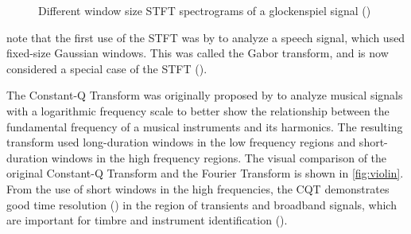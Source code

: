 \documentclass[report.tex]{subfiles}
\begin{document}
\begin{figure}[ht]
	\centering
	\hspace{0.5em}
	\caption{Different window size STFT spectrograms of a glockenspiel signal (\cite[1]{jaillet})}
	\label{fig:stfttradeoff}
\end{figure}

\textcite{dictionary} note that the first use of the STFT was by \textcite{gabor1946} to analyze a speech signal, which used fixed-size Gaussian windows. This was called the Gabor transform, and is now considered a special case of the STFT (\cite{dictionary}).

The Constant-Q Transform was originally proposed by \textcite{jbrown} to analyze musical signals with a logarithmic frequency scale to better show the relationship between the fundamental frequency of a musical instruments and its harmonics. The resulting transform used long-duration windows in the low frequency regions and short-duration windows in the high frequency regions. The visual comparison of the original Constant-Q Transform and the Fourier Transform is shown in \ref{fig:violin}. From the use of short windows in the high frequencies, the CQT demonstrates good time resolution (\cite{cqtransient}) in the region of transients and broadband signals, which are important for timbre and instrument identification (\cite{timbretransients1, timbretransients2}).
\end{document}
